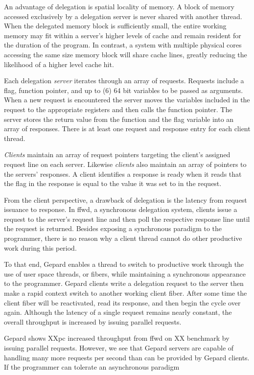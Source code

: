 \documentclass{uicthesi}
\begin{document}
An advantage of delegation is spatial locality of memory. A block of memory accessed exclusively by a delegation server is never shared with another thread. When the delegated memory block is sufficiently small, the entire working memory may fit within a server's higher levels of cache and remain resident for the duration of the program. In contrast, a system with multiple physical cores accessing the same size memory block will share cache lines, greatly reducing the likelihood of a higher level cache hit. 

Each delegation \textit{server} iterates through an array of requests. Requests include a flag, function pointer, and up to (6) 64 bit variables to be passed as arguments. When a new request is encountered the server moves the variables included in the request to the appropriate registers and then calls the function pointer. The server stores the return value from the function and the flag variable into an array of responses. There is at least one request and response entry for each client thread. 

\textit{Clients} maintain an array of request pointers targeting the client's assigned request line on each server. Likewise \textit{clients} also maintain an array of pointers to the servers' responses. A client identifies a response is ready when it reads that the flag in the response is equal to the value it was set to in the request. 

From the client perspective, a drawback of delegation is the latency from request issuance to response. In ffwd, a synchronous delegation system, clients issue a request to the server's request line and then poll the respective response line until the request is returned. Besides exposing a synchronous paradigm to the programmer, there is no reason why a client thread cannot do other productive work during this period.  

To that end, Gepard enables a thread to switch to productive work through the use of user space threads, or fibers, while maintaining a synchronous appearance to the programmer. Gepard clients write a delegation request to the server then make a rapid context switch to another working client fiber. After some time the client fiber will be reactivated, read its response, and then begin the cycle over again. Although the latency of a single request remains nearly constant, the overall throughput is increased by issuing parallel requests. 

Gepard shows XXpc increased throughput from ffwd on XX benchmark by issuing parallel requests. However, we see that Gepard servers are capable of handling many more requests per second than can be provided by Gepard clients. If the programmer can tolerate an asynchronous paradigm 
\end{document}
